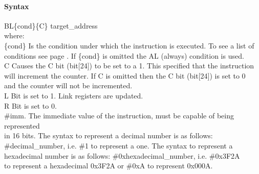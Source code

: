 \documentclass[12pt]{article}
\begin{document}
    \paragraph{Syntax}
    \begin{flushleft}
    BL\{cond\}\{C\} target\_address\\%
    \vspace{1em}        %
    where:\\
    \vspace{1em}
    \{cond\}    \hspace{2em} Is the condition under which the instruction is executed. To see a list of\\
                \hspace{5.4em} conditions see page . If \{cond\} is omitted the AL (always) condition is used.\\
    \vspace{1em}
    C       \hspace{4.5em} Causes the C bit (bit[24]) to be set to a 1. This specified that the instruction\\
            \hspace{5.4em} will increment the counter. If C is omitted then the C bit (bit[24]) is set to 0\\
            \hspace{5.4em} and the counter will not be incremented.\\
    \vspace{1em}
    L       \hspace{4.5em} Bit is set to 1. Link registers are updated.\\
    \vspace{1em}
    R       \hspace{4.5em} Bit is set to 0.\\
    \vspace{1em}
    \#imm.  \hspace{1.8em} The immediate value of the instruction, must be capable of being represented\\              \hspace{5.4em} in 16 bits. The syntax to represent a decimal number is as follows:\\
            \hspace{5.4em} \#decimal\_number, i.e. \#1 to represent a one. The syntax to represent a\\
            \hspace{5.4em} hexadecimal number is as follows: \#0xhexadecimal\_number, i.e. \#0x3F2A \\
            \hspace{5.4em} to represent a hexadecimal 0x3F2A or \#0xA to represent 0x000A.\\
    \end{flushleft}
    
\end{document}
